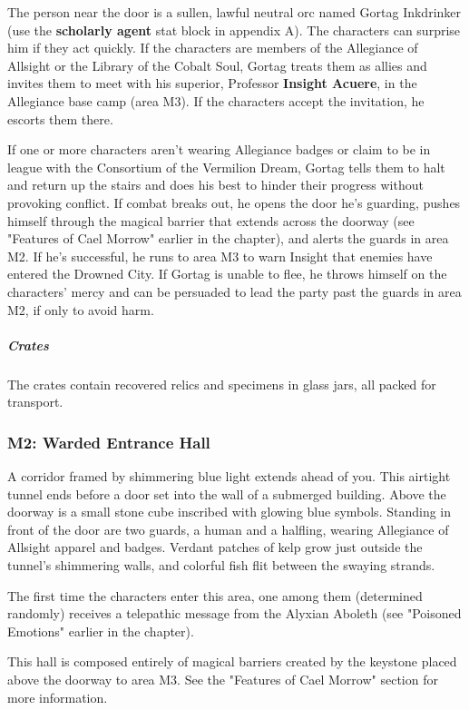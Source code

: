 \documentclass[10pt,a4paper,twoside,bg=print,twocolumn,openany,nodeprecatedcode]{dndbook}
\begin{document}
The person near the door is a sullen, lawful neutral orc named Gortag Inkdrinker (use the \textbf{scholarly agent} stat block in appendix A). The characters can surprise him if they act quickly. If the characters are members of the Allegiance of Allsight or the Library of the Cobalt Soul, Gortag treats them as allies and invites them to meet with his superior, Professor \textbf{Insight Acuere}, in the Allegiance base camp (area M3). If the characters accept the invitation, he escorts them there.

If one or more characters aren't wearing Allegiance badges or claim to be in league with the Consortium of the Vermilion Dream, Gortag tells them to halt and return up the stairs and does his best to hinder their progress without provoking conflict. If combat breaks out, he opens the door he's guarding, pushes himself through the magical barrier that extends across the doorway (see "Features of Cael Morrow" earlier in the chapter), and alerts the guards in area M2. If he's successful, he runs to area M3 to warn Insight that enemies have entered the Drowned City. If Gortag is unable to flee, he throws himself on the characters' mercy and can be persuaded to lead the party past the guards in area M2, if only to avoid harm.

\subparagraph{Crates}
The crates contain recovered relics and specimens in glass jars, all packed for transport.

\subsubsection{M2: Warded Entrance Hall}
\begin{DndReadAloud}{}
A corridor framed by shimmering blue light extends ahead of you. This airtight tunnel ends before a door set into the wall of a submerged building. Above the doorway is a small stone cube inscribed with glowing blue symbols. Standing in front of the door are two guards, a human and a halfling, wearing Allegiance of Allsight apparel and badges. Verdant patches of kelp grow just outside the tunnel's shimmering walls, and colorful fish flit between the swaying strands.

\end{DndReadAloud}

The first time the characters enter this area, one among them (determined randomly) receives a telepathic message from the Alyxian Aboleth (see "Poisoned Emotions" earlier in the chapter).

This hall is composed entirely of magical barriers created by the keystone placed above the doorway to area M3. See the "Features of Cael Morrow" section for more information.
\end{document}
